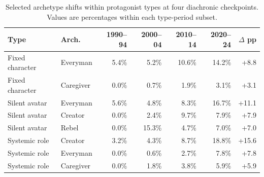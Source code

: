 \begin{table}[t]
\centering
\caption{Selected archetype shifts within protagonist types at four diachronic checkpoints. Values are percentages within each type-period subset.}
\label{tab:archetype_within_type_checkpoints}
\small
\setlength{\tabcolsep}{4pt}
\begin{tabular}{llrrrrr}
\toprule
\textbf{Type} & \textbf{Arch.} & \textbf{1990--94} & \textbf{2000--04} & \textbf{2010--14} & \textbf{2020--24} & \textbf{$\Delta$ pp} \\
\midrule
Fixed character & Everyman & 5.4\% & 5.2\% & 10.6\% & 14.2\% & +8.8 \\
Fixed character & Caregiver & 0.0\% & 0.7\% & 1.9\% & 3.1\% & +3.1 \\
Silent avatar & Everyman & 5.6\% & 4.8\% & 8.3\% & 16.7\% & +11.1 \\
Silent avatar & Creator & 0.0\% & 2.4\% & 9.7\% & 7.9\% & +7.9 \\
Silent avatar & Rebel & 0.0\% & 15.3\% & 4.7\% & 7.0\% & +7.0 \\
Systemic role & Creator & 3.2\% & 4.3\% & 8.7\% & 18.8\% & +15.6 \\
Systemic role & Everyman & 0.0\% & 0.6\% & 2.7\% & 7.8\% & +7.8 \\
Systemic role & Caregiver & 0.0\% & 1.8\% & 3.8\% & 5.9\% & +5.9 \\
\bottomrule
\end{tabular}
\end{table}
